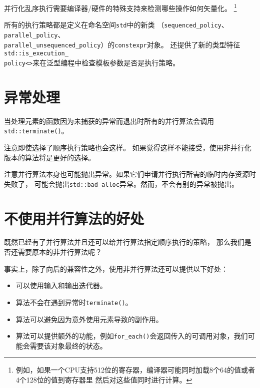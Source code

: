 并行化乱序执行需要编译器/硬件的特殊支持来检测哪些操作如何矢量化。
\footnote{例如，如果一个CPU支持512位的寄存器，编译器可能同时加载8个64的值或者4个128位的值到寄存器里
然后对这些值同时进行计算。}

所有的执行策略都是定义在命名空间\texttt{std}中的新类
（\texttt{sequenced\_policy}、\texttt{parallel\_policy}、\\
\texttt{parallel\_unsequenced\_policy}）的\texttt{constexpr}对象。
还提供了新的类型特征\texttt{std::is\_execution\_\\
policy<>}来在泛型编程中检查模板参数是否是执行策略。


\section{异常处理}
当处理元素的函数因为未捕获的异常而退出时所有的并行算法会调用\texttt{std::terminate()}。

注意即使选择了顺序执行策略也会这样。
如果觉得这样不能接受，使用非并行化版本的算法将是更好的选择。

注意并行算法本身也可能抛出异常。如果它们申请并行执行所需的临时内存资源时失败了，
可能会抛出\texttt{std::bad\_alloc}异常。然而，不会有别的异常被抛出。


\section{不使用并行算法的好处}\label{ch22.4}
既然已经有了并行算法并且还可以给并行算法指定顺序执行的策略，
那么我们是否还需要原本的非并行算法呢？

事实上，除了向后的兼容性之外，使用非并行算法还可以提供以下好处：
\begin{itemize}
    \item 可以使用输入和输出迭代器。
    \item 算法不会在遇到异常时\texttt{terminate()}。
    \item 算法可以避免因为意外使用元素导致的副作用。
    \item 算法可以提供额外的功能，例如\texttt{for\_each()}会返回传入的可调用对象，我们可能会需要该对象最终的状态。
\end{itemize}


